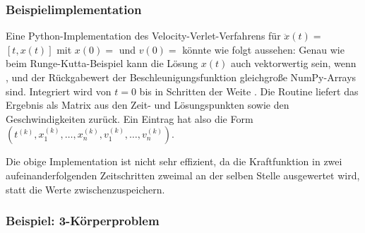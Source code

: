 \subsubsection{Beispielimplementation}

Eine Python-Implementation des Velocity-Verlet-Verfahrens für $\ddot
x(t) = $$[t, x(t)]$ mit $x(0) =$  und $v(0) =$
 könnte wie folgt aussehen:%
%
Genau wie beim Runge-Kutta-Beispiel kann die Lösung $x(t)$ auch
vektorwertig sein, wenn ,  und der Rückgabewert der
Beschleunigungsfunktion  gleichgroße NumPy-Arrays
sind. Integriert wird von $t=0$ bis  in Schritten der Weite
. Die Routine liefert das Ergebnis als Matrix aus den Zeit-
und Lösungspunkten sowie den Geschwindigkeiten zurück. Ein Eintrag hat
also die Form $\left(t^{(k)}, x^{(k)}_1,\ldots,x^{(k)}_n,
v^{(k)}_1,\ldots,v^{(k)}_n\right)$.

Die obige Implementation ist nicht sehr effizient, da die
Kraftfunktion in zwei aufeinanderfolgenden Zeitschritten zweimal an
der selben Stelle ausgewertet wird, statt die Werte
zwischenzuspeichern.

\subsubsection{Beispiel: 3-Körperproblem}

